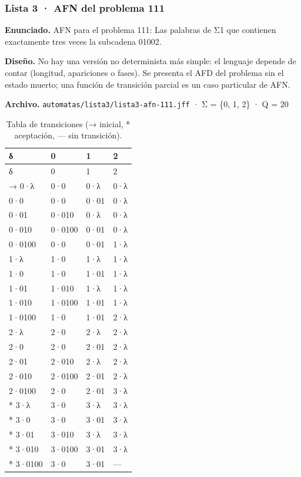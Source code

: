 
\hypertarget{lista-3-afn-del-problema-111}{%
\subsubsection{Lista 3 · AFN del problema 111}\label{lista-3-afn-del-problema-111}}

\textbf{Enunciado.} AFN para el problema 111: Las palabras de Σ1 que contienen exactamente tres veces la subcadena 01002.

\textbf{Diseño.} No hay una versión no determinista más simple: el lenguaje depende de contar (longitud, apariciones o fases). Se presenta el AFD del problema sin el estado muerto; una función de transición parcial es un caso particular de AFN.

\textbf{Archivo.} \texttt{automatas/lista3/lista3-afn-111.jff} · Σ = \{0, 1, 2\} · \textbar Q\textbar{} = 20

\begin{longtable}[]{@{}llll@{}}
\caption{Tabla de transiciones (→ inicial, * aceptación, --- sin transición).}\tabularnewline
\toprule\noalign{}
δ & 0 & 1 & 2 \\
\midrule\noalign{}
\endfirsthead
\toprule\noalign{}
δ & 0 & 1 & 2 \\
\midrule\noalign{}
\endhead
\bottomrule\noalign{}
\endlastfoot
→ 0·λ & 0·0 & 0·λ & 0·λ \\
0·0 & 0·0 & 0·01 & 0·λ \\
0·01 & 0·010 & 0·λ & 0·λ \\
0·010 & 0·0100 & 0·01 & 0·λ \\
0·0100 & 0·0 & 0·01 & 1·λ \\
1·λ & 1·0 & 1·λ & 1·λ \\
1·0 & 1·0 & 1·01 & 1·λ \\
1·01 & 1·010 & 1·λ & 1·λ \\
1·010 & 1·0100 & 1·01 & 1·λ \\
1·0100 & 1·0 & 1·01 & 2·λ \\
2·λ & 2·0 & 2·λ & 2·λ \\
2·0 & 2·0 & 2·01 & 2·λ \\
2·01 & 2·010 & 2·λ & 2·λ \\
2·010 & 2·0100 & 2·01 & 2·λ \\
2·0100 & 2·0 & 2·01 & 3·λ \\
* 3·λ & 3·0 & 3·λ & 3·λ \\
* 3·0 & 3·0 & 3·01 & 3·λ \\
* 3·01 & 3·010 & 3·λ & 3·λ \\
* 3·010 & 3·0100 & 3·01 & 3·λ \\
* 3·0100 & 3·0 & 3·01 & --- \\
\end{longtable}

